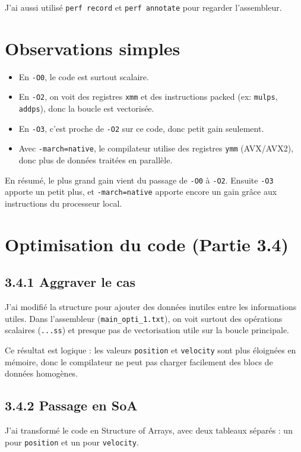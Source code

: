\documentclass[a4paper,12pt]{article}
\begin{document}
J'ai aussi utilisé \texttt{perf record} et \texttt{perf annotate} pour regarder l'assembleur.

\section{Observations simples}
\begin{itemize}
    \item En \texttt{-O0}, le code est surtout scalaire.
    \item En \texttt{-O2}, on voit des registres \texttt{xmm} et des instructions packed (ex: \texttt{mulps}, \texttt{addps}), donc la boucle est vectorisée.
    \item En \texttt{-O3}, c'est proche de \texttt{-O2} sur ce code, donc petit gain seulement.
    \item Avec \texttt{-march=native}, le compilateur utilise des registres \texttt{ymm} (AVX/AVX2), donc plus de données traitées en parallèle.
\end{itemize}

En résumé, le plus grand gain vient du passage de \texttt{-O0} à \texttt{-O2}. Ensuite \texttt{-O3} apporte un petit plus, et \texttt{-march=native} apporte encore un gain grâce aux instructions du processeur local.

\newpage

\section{Optimisation du code (Partie 3.4)}

\subsection{3.4.1 Aggraver le cas}
J'ai modifié la structure pour ajouter des données inutiles entre les informations utiles. Dans l'assembleur (\texttt{main\_opti\_1.txt}), on voit surtout des opérations scalaires (\texttt{...ss}) et presque pas de vectorisation utile sur la boucle principale.

Ce résultat est logique : les valeurs \texttt{position} et \texttt{velocity} sont plus éloignées en mémoire, donc le compilateur ne peut pas charger facilement des blocs de données homogènes.

\subsection{3.4.2 Passage en SoA}
J'ai transformé le code en Structure of Arrays, avec deux tableaux séparés : un pour \texttt{position} et un pour \texttt{velocity}.
\end{document}
